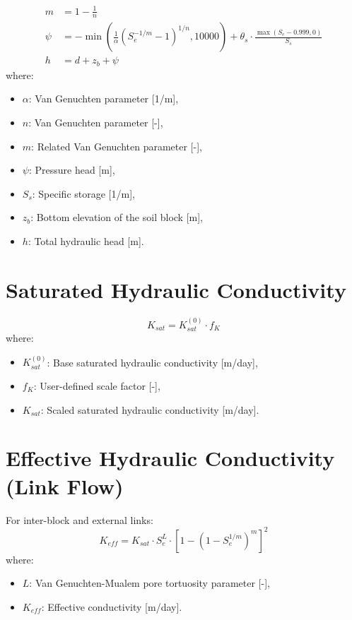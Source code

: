 \documentclass[12pt]{report}
\begin{document}
\begin{align}
m &= 1 - \frac{1}{n} \\
\psi &= -\min\left(\frac{1}{\alpha} \left( S_e^{-1/m} - 1 \right)^{1/n}, 10000\right) + \theta_s \cdot \frac{\max\left(S_e - 0.999, 0\right)}{S_s} \\
h &= d + z_b + \psi
\end{align}
where:
\begin{itemize}
\item $\alpha$: Van Genuchten parameter [1/m],
\item $n$: Van Genuchten parameter [-],
\item $m$: Related Van Genuchten parameter [-],
\item $\psi$: Pressure head [m],
\item $S_s$: Specific storage [1/m],
\item $z_b$: Bottom elevation of the soil block [m],
\item $h$: Total hydraulic head [m].
\end{itemize}

\section{Saturated Hydraulic Conductivity}

\begin{equation}
K_{sat} = K_{sat}^{(0)} \cdot f_K
\end{equation}
where:
\begin{itemize}
\item $K_{sat}^{(0)}$: Base saturated hydraulic conductivity [m/day],
\item $f_K$: User-defined scale factor [-],
\item $K_{sat}$: Scaled saturated hydraulic conductivity [m/day].
\end{itemize}

\section{Effective Hydraulic Conductivity (Link Flow)}

For inter-block and external links:
\begin{equation}
K_{eff} = K_{sat} \cdot S_e^L \cdot \left[1 - \left(1 - S_e^{1/m}\right)^m \right]^2
\end{equation}
where:
\begin{itemize}
\item $L$: Van Genuchten-Mualem pore tortuosity parameter [-],
\item $K_{eff}$: Effective conductivity [m/day].
\end{itemize}
\end{document}
